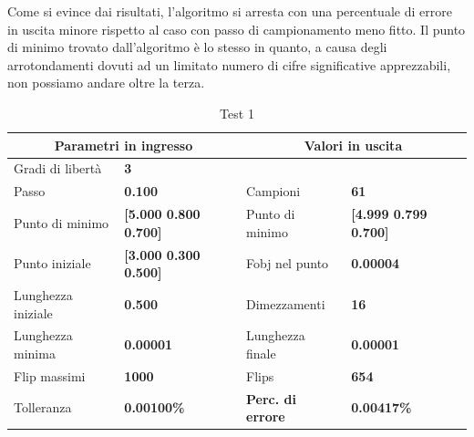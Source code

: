 \documentclass[a4paper, 11pt]{article}
\begin{document}
\noindent
Come si evince dai risultati, l'algoritmo si arresta con una percentuale di
errore in uscita minore rispetto al caso con passo di campionamento meno fitto.
Il punto di minimo trovato dall'algoritmo è lo stesso in quanto, a causa degli
arrotondamenti dovuti ad un limitato numero di cifre significative apprezzabili,
non possiamo andare oltre la terza.

\begin{table}[h]
    \caption{Test 1}
    \begin{center}
    \begin{tabular}{|l|l|l|l|} 
    \hline 
\multicolumn{2}{|c|}{\textbf{Parametri in ingresso}} &
\multicolumn{2}{c|}{\textbf{Valori in uscita}} \\ \hline
Gradi di libertà  & \textbf{3} &  &  \\ \hline 
Passo & \textbf{0.100} & Campioni & \textbf{61} \\ \hline 
Punto di minimo & \textbf{{[}5.000 0.800 0.700{]}} & Punto di minimo &
\textbf{{[}4.999 0.799 0.700{]}} \\ \hline 
Punto iniziale & \textbf{{[}3.000 0.300 0.500{]}} & Fobj nel punto &
\textbf{0.00004} \\ \hline 
Lunghezza iniziale & \textbf{0.500} & Dimezzamenti & \textbf{16} \\ \hline 
Lunghezza minima & \textbf{0.00001} & Lunghezza finale & \textbf{0.00001} \\
\hline
Flip massimi & \textbf{1000} & Flips & \textbf{654} \\ \hline 
Tolleranza & \textbf{0.00100\%} & \textbf{Perc. di errore} & \textbf{0.00417\%}
\\ \hline 
    \end{tabular}
    \end{center}
    \end{table}
\end{document}
